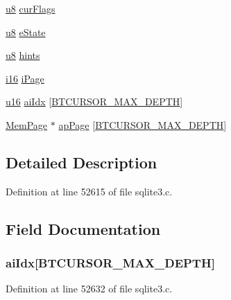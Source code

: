 \begin{DoxyCompactItemize}
\hyperlink{sqlite3_8c_a74a0f6424ae628af25f23f0a35f6ead3}{u8} \hyperlink{struct_bt_cursor_a3bae5f0b147a8a42b815f3512dc3b46e}{cur\+Flags}
\item 
\hyperlink{sqlite3_8c_a74a0f6424ae628af25f23f0a35f6ead3}{u8} \hyperlink{struct_bt_cursor_ae5babd54e329060ed9f926ca6df3ab4d}{e\+State}
\item 
\hyperlink{sqlite3_8c_a74a0f6424ae628af25f23f0a35f6ead3}{u8} \hyperlink{struct_bt_cursor_a6d76178ed694d71107fbae62d6fa9c38}{hints}
\item 
\hyperlink{sqlite3_8c_a7b32340f65cd15f029caad258fb3355c}{i16} \hyperlink{struct_bt_cursor_a37e2c5de2a48868560612bced0c093aa}{i\+Page}
\item 
\hyperlink{sqlite3_8c_a20f2299e322dcbde37cb07b16910b843}{u16} \hyperlink{struct_bt_cursor_aa7bcf3a5085daf9736d8665a21f6f70e}{ai\+Idx} \mbox{[}\hyperlink{sqlite3_8c_af0a8a704218e75e8258f2e33c3505473}{B\+T\+C\+U\+R\+S\+O\+R\+\_\+\+M\+A\+X\+\_\+\+D\+E\+P\+T\+H}\mbox{]}
\item 
\hyperlink{struct_mem_page}{Mem\+Page} $\ast$ \hyperlink{struct_bt_cursor_a48324efc61de2768ab83887316925682}{ap\+Page} \mbox{[}\hyperlink{sqlite3_8c_af0a8a704218e75e8258f2e33c3505473}{B\+T\+C\+U\+R\+S\+O\+R\+\_\+\+M\+A\+X\+\_\+\+D\+E\+P\+T\+H}\mbox{]}
\end{DoxyCompactItemize}


\subsection{Detailed Description}


Definition at line 52615 of file sqlite3.\+c.



\subsection{Field Documentation}
\hypertarget{struct_bt_cursor_aa7bcf3a5085daf9736d8665a21f6f70e}{}
\subsubsection[{ai\+Idx}]{ ai\+Idx\mbox{[}{\bf B\+T\+C\+U\+R\+S\+O\+R\+\_\+\+M\+A\+X\+\_\+\+D\+E\+P\+T\+H}\mbox{]}}\label{struct_bt_cursor_aa7bcf3a5085daf9736d8665a21f6f70e}


Definition at line 52632 of file sqlite3.\+c.



